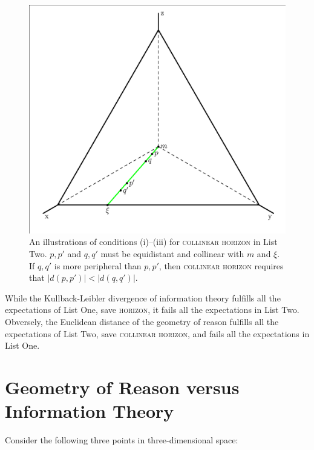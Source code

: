 \documentclass[11pt]{article}
\begin{document}
\begin{figure}[ht]
  \begin{flushright}
    \begin{minipage}[h]{.7\linewidth}
      \includegraphics[width=\textwidth]{horeff.eps}
      \caption{\footnotesize An illustrations of conditions (i)--(iii)
        for \textsc{collinear horizon} in List Two. $p,p'$ and $q,q'$
        must be equidistant and collinear with $m$ and $\xi$. If
        $q,q'$ is more peripheral than $p,p'$, then \textsc{collinear
          horizon} requires that $|d(p,p')|<|d(q,q')|$.}
      \label{fig:conditions}
    \end{minipage}
  \end{flushright}
\end{figure}

While the Kullback-Leibler divergence of information theory fulfills
all the expectations of List One, save \textsc{horizon}, it fails all
the expectations in List Two. Obversely, the Euclidean distance of the
geometry of reason fulfills all the expectations of List Two, save
\textsc{collinear horizon}, and fails all the expectations in List
One.

\section{Geometry of Reason versus Information Theory}
\label{grit}

Consider the following three points in three-dimensional space:
\end{document}
